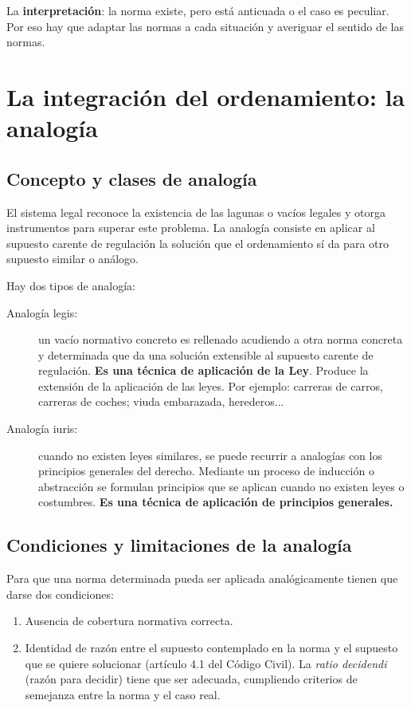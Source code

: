 \documentclass[a4paper,12pt]{report}
\begin{document}
La \textbf{interpretación}: la norma existe, pero está anticuada o el caso es peculiar. Por eso hay que adaptar las normas a cada situación y averiguar el sentido de las normas.

\section{La integración del ordenamiento: la analogía}
\subsection{Concepto y clases de analogía}

El sistema legal reconoce la existencia de las lagunas o vacíos legales y otorga instrumentos para superar este problema. La analogía consiste en aplicar al supuesto carente de regulación la solución que el ordenamiento sí da para otro supuesto similar o análogo.

Hay dos tipos de analogía:

\begin{description}
\item[Analogía legis:] un vacío normativo concreto es rellenado acudiendo a otra norma concreta y determinada que da una solución extensible al supuesto carente de regulación. \textbf{Es una técnica de aplicación de la Ley}. Produce la extensión de la aplicación de las leyes. Por ejemplo: carreras de carros, carreras de coches; viuda embarazada, herederos...
\item[Analogía iuris:] cuando no existen leyes similares, se puede recurrir a analogías con los principios generales del derecho. Mediante un proceso de inducción o abstracción se formulan principios que se aplican cuando no existen leyes o costumbres. \textbf{Es una técnica de aplicación de principios generales.}
\end{description}

\subsection{Condiciones y limitaciones de la analogía}

Para que una norma determinada pueda ser aplicada analógicamente tienen que darse dos condiciones:
\begin{enumerate}
\item Ausencia de cobertura normativa correcta.
\item Identidad de razón entre el supuesto contemplado en la norma y el supuesto que se quiere solucionar (artículo 4.1 del Código Civil). La \textit{ratio decidendi} (razón para decidir) tiene que ser adecuada, cumpliendo criterios de semejanza entre la norma y el caso real.
\end{enumerate}
\end{document}
